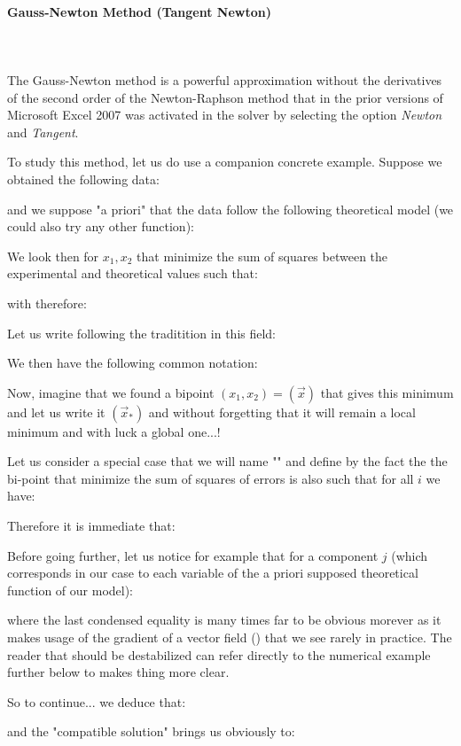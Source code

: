 	\paragraph{Gauss-Newton Method (Tangent Newton)}\mbox{}\\\\
	The Gauss-Newton method is a powerful approximation without the derivatives of the second order of the Newton-Raphson method that in the prior versions of Microsoft Excel 2007 was activated in the solver by selecting the option \textit{Newton} and \textit{Tangent}.

	To study this method, let us do use a companion concrete example. Suppose we obtained the following data:
	
	and we suppose "a priori" that the data follow the following theoretical model (we could also try any other function):
	 
	We look then for $x_1,x_2$ that minimize the sum of squares between the experimental and theoretical values such that:
	
	with therefore:
	
	Let us write following the traditition in this field:
	
	We then have the following common notation:
	
	Now, imagine that we found a bipoint $(x_1,x_2)=(\vec{x})$ that gives this minimum and let us write it $(\vec{x}_{*})$ and without forgetting that it will remain a local minimum and with luck a global one...! 

	Let us consider a special case that we will name "" and define by the fact the the bi-point that minimize the sum of squares of errors is also such that for all $i$ we have:
	
	Therefore it is immediate that:
	
	Before going further, let us notice for example that for a component $j$ (which corresponds in our case to each variable of the a priori supposed theoretical function of our model):
	
	where the last condensed equality is many times far to be obvious morever as it makes usage of the gradient of a vector field () that we see rarely in practice. The reader that should be destabilized can refer directly to the numerical example further below to makes thing more clear.

	So to continue... we deduce that:
	
	and the "compatible solution" brings us obviously to:
	
